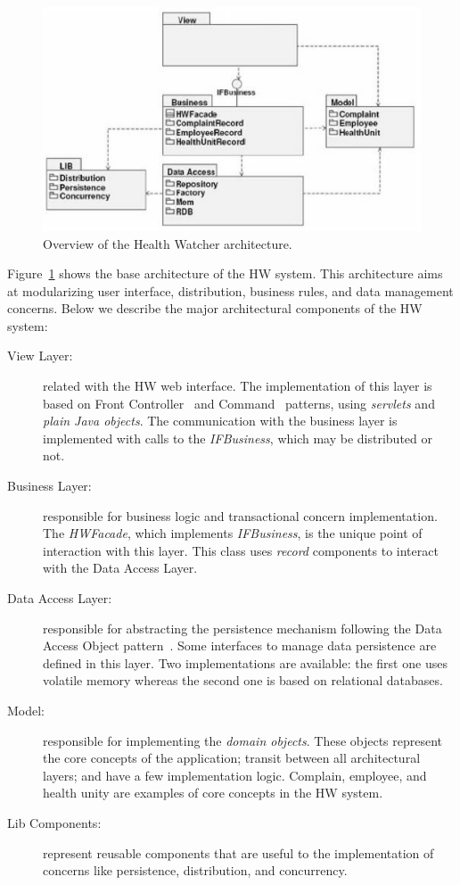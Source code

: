 \begin{figure}[t]
\centering
\includegraphics[scale=0.5]{images/hw.eps}
\caption{Overview of the Health Watcher architecture.}
\label{fig:hw-architecture}
\end{figure}

Figure~\ref{fig:hw-architecture} shows the base architecture of the
HW system. This architecture aims at modularizing user interface,
distribution, business rules, and data management concerns. Below
we describe the major architectural components of the HW system:

\begin{description}

\item [View Layer:] related with the HW web interface. The
implementation of this layer is based on Front
Controller~\cite{alur-book-2003} and
Command~\cite{gamma-dpbook-1995} patterns, using \emph{servlets}
and \emph{plain Java objects}. The communication with the business layer
is implemented with calls to the \emph{IFBusiness}, which may be
distributed or not.

\item [Business Layer:] responsible for business
logic and transactional concern implementation. The
\emph{HWFacade}, which implements \emph{IFBusiness}, is the unique
point of interaction with this layer. This class uses
\emph{record} components to interact with the Data Access Layer.

\item [Data Access Layer:] responsible for abstracting the persistence
mechanism following the Data Access Object
pattern~\cite{alur-book-2003}. Some interfaces to
manage data persistence are defined in this layer. Two
implementations are available: the first one uses volatile memory
whereas the second one is based on relational databases.

\item [Model:] responsible for implementing the \emph{domain objects}.
These objects represent the core concepts of the application;
transit between all architectural layers; and have a few
implementation logic. Complain, employee, and health unity are examples of 
core concepts in the HW system. 

\item [Lib Components:] represent reusable components that are useful
to the implementation of concerns like persistence, distribution,
and concurrency.
\end{description}

